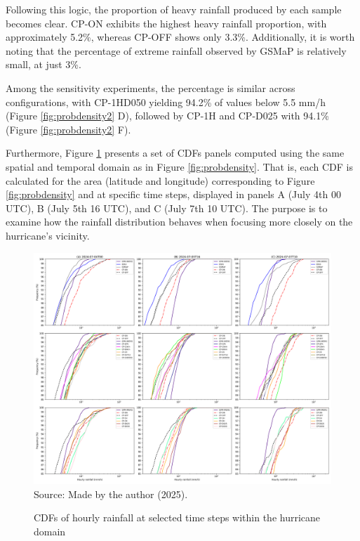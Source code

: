 Following this logic, the proportion of heavy rainfall produced by each sample becomes clear. CP-ON exhibits the highest heavy rainfall proportion, with approximately 5.2\%, whereas CP-OFF shows only 3.3\%. Additionally, it is worth noting that the percentage of extreme rainfall observed by GSMaP is relatively small, at just 3\%.

Among the sensitivity experiments, the percentage is similar across configurations, with CP-1HD050 yielding 94.2\% of values below 5.5 mm/h (Figure \ref{fig:probdensity2} D), followed by CP-1H and CP-D025 with 94.1\% (Figure \ref{fig:probdensity2} F).

Furthermore, Figure \ref{fig:probdensity3} presents a set of CDFs panels computed using the same spatial and temporal domain as in Figure \ref{fig:probdensity}. That is, each CDF is calculated for the area (latitude and longitude) corresponding to Figure \ref{fig:probdensity} and at specific time steps, displayed in panels A (July 4th 00 UTC), B (July 5th 16 UTC), and C (July 7th 10 UTC). The purpose is to examine how the rainfall distribution behaves when focusing more closely on the hurricane's vicinity.

\begin{figure}[!ht]
	\centering
	\caption{CDFs of hourly rainfall at selected time steps within the hurricane domain} %
	\includegraphics[width=\textwidth]{docs/figuras/chapter5/SNAPSHOTS_percentile_CDF_FINAL.png} 
	\vspace{0.5em}
	Source: Made by the author (2025).  %
	\label{fig:probdensity3} %
\end{figure}

